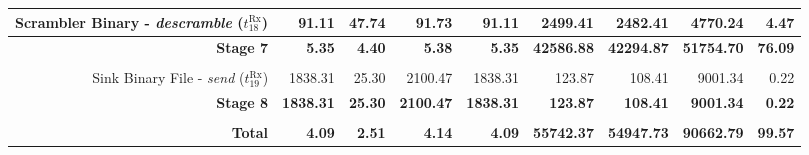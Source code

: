 \begin{table}[htp]
{{\begin{tabular}{r | r r r r  | r r r | r}
                 Scrambler Binary -    \emph{descramble} ($t^\text{Rx}_{18}$) &           91.11  &            47.74  &            91.73  &                                  91.11  &          2499.41  &          2482.41  &          4770.24  &          4.47  \\ \hline
    \rowcolor{Paired-1!15}                                   \textbf{Stage 7} &    \textbf{5.35} &     \textbf{4.40} &     \textbf{5.38} &                           \textbf{5.35} & \textbf{42586.88} & \textbf{42294.87} & \textbf{51754.70} & \textbf{76.09} \\ %
                                                                              &                  &                   &                   &                                         &                   &                   &                   &                \\
    \rowcolor{Paired-7!15}
                 Sink Binary File -          \emph{send} ($t^\text{Rx}_{19}$) &         1838.31  &            25.30  &          2100.47  &                                1838.31  &           123.87  &           108.41  &          9001.34  &          0.22  \\ \hline
                                                             \textbf{Stage 8} & \textbf{1838.31} &    \textbf{25.30} &  \textbf{2100.47} &                        \textbf{1838.31} &   \textbf{123.87} &   \textbf{108.41} &  \textbf{9001.34} &  \textbf{0.22} \\ %
                                                                              &                  &                   &                   &                                         &                   &                   &                   &                \\ \hline \hline
                                                               \textbf{Total} &    \textbf{4.09} &     \textbf{2.51} &     \textbf{4.14} &                           \textbf{4.09} & \textbf{55742.37} & \textbf{54947.73} & \textbf{90662.79} & \textbf{99.57} \\ %
  \end{tabular}
  }}
\end{table}

